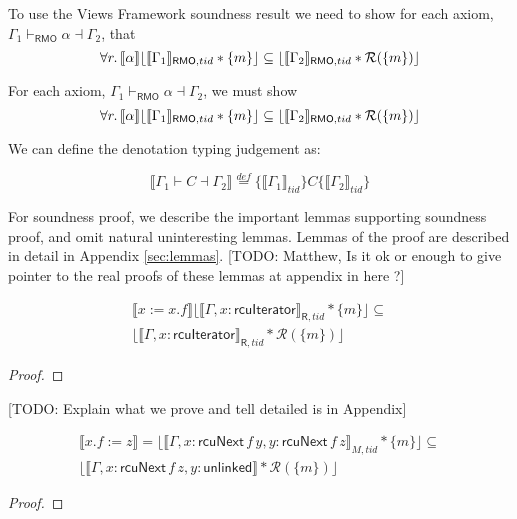 To use the Views Framework soundness result we need to show for each axiom, $\Gamma_{1} \vdash_{\textsf{RMO}} \alpha \dashv \Gamma_{2}$, that
\[
\forall r\ldotp   \llbracket \alpha \rrbracket  \lfloor \llbracket \Gamma_{1} \rrbracket_{\textsf{RMO},tid}  * \{m\} \rfloor \subseteq \\
  \lfloor \llbracket \Gamma_{2} \rrbracket_{\textsf{RMO},tid} * \mathcal{R}(\{m\}) \rfloor
\]
\begin{theorem}
For each axiom, $\Gamma_{1} \vdash_{\textsf{RMO}} \alpha \dashv \Gamma_{2}$, we must show
\[
\forall r\ldotp   \llbracket \alpha \rrbracket  \lfloor \llbracket \Gamma_{1} \rrbracket_{\textsf{RMO},tid}  * \{m\} \rfloor \subseteq  \lfloor \llbracket \Gamma_{2} \rrbracket_{\textsf{RMO},tid} * \mathcal{R}(\{m\}) \rfloor
\]
\end{theorem}

We can define the denotation typing judgement as: 

\[ \llbracket \Gamma_{1} \vdash C \dashv \Gamma_{2} \rrbracket \stackrel{def}{=} \{ \llbracket \Gamma_{1} \rrbracket_{tid}\} C \{ \llbracket \Gamma_{2} \rrbracket_{tid}\} \]

For soundness proof, we describe the important lemmas supporting soundness proof, and omit natural uninteresting lemmas. Lemmas of the proof are described in detail in Appendix \ref{sec:lemmas}.
[TODO: Matthew, Is it ok or enough to give pointer to the real proofs of these lemmas at appendix in here ?]
\begin{Lemma}
\begin{gather*}
\llbracket x:=x.f \rrbracket \lfloor \llbracket \Gamma,x:\mathsf{rcuIterator} \rrbracket_{\textsf{R},tid} * \{m\}\rfloor\subseteq \\
\lfloor \llbracket \Gamma,x:\mathsf{rcuIterator} \rrbracket_{\textsf{R},tid}  * \mathcal{R}(\{m\})\rfloor 
\end{gather*}
\end{Lemma}
\begin{proof}
\end{proof}

[TODO: Explain what we prove and tell detailed is in Appendix]

\begin{Lemma}
\begin{gather*}
\llbracket x.f:=z \rrbracket = \lfloor \llbracket \Gamma,x:\mathsf{rcuNext} \, f \, y, y:\mathsf{rcuNext} \, f \, z \rrbracket_{M,tid} * \{m\}\rfloor  \subseteq 
\\ \lfloor \llbracket \Gamma,x:\mathsf{rcuNext} \, f \, z, y:\mathsf{unlinked} \rrbracket  * \mathcal{R}(\{m\})\rfloor 
\end{gather*}
\end{Lemma}
\begin{proof}
\end{proof}

